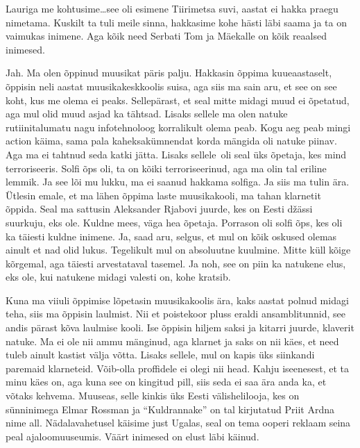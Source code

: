 Lauriga me kohtusime\ldots see oli esimene Tiirimetsa suvi, aastat ei hakka praegu nimetama. Kuskilt ta tuli meile sinna, hakkasime kohe hästi läbi saama ja ta on vaimukas inimene. Aga kõik need Serbati Tom ja Mäekalle  on kõik reaalsed inimesed.


Jah. Ma olen õppinud muusikat päris palju. Hakkasin õppima kuueaastaselt, õppisin neli aastat muusikakeskkoolis suisa, aga siis ma sain aru, et see on see koht, kus me olema ei peaks. Sellepärast, et seal mitte midagi muud ei õpetatud, aga mul olid muud asjad ka tähtsad. Lisaks sellele ma olen natuke rutiinitalumatu nagu infotehnoloog korralikult olema peab. Kogu aeg peab mingi action käima, sama pala kaheksakümnendat korda mängida oli natuke piinav. Aga ma ei  tahtnud seda katki jätta.  Lisaks sellele oli seal üks õpetaja, kes mind terroriseeris. Solfi õps oli, ta on kõiki terroriseerinud, aga ma olin tal eriline lemmik. Ja see lõi mu lukku, ma ei saanud hakkama solfiga. Ja siis ma tulin ära. Ütlesin emale, et ma lähen õppima laste muusikakooli, ma tahan klarnetit õppida. Seal ma sattusin Aleksander Rjabovi juurde, kes on Eesti džässi suurkuju, eks ole. Kuldne mees, väga hea õpetaja. Porrason oli solfi õps, kes oli ka täiesti  kuldne inimene. Ja, saad aru, selgus, et mul on kõik oskused olemas ainult et nad olid lukus. Tegelikult mul on absoluutne kuulmine. Mitte küll  kõige kõrgemal, aga täiesti arvestataval tasemel. Ja noh, see on piin ka natukene elus, eks ole, kui natukene midagi valesti on, kohe kratsib. 

Kuna ma viiuli  õppimise lõpetasin muusikakoolis ära, kaks aastat polnud midagi teha, siis ma õppisin laulmist. Nii et poistekoor pluss eraldi ansamblitunnid, see andis pärast kõva laulmise kooli. Ise õppisin hiljem saksi ja kitarri juurde, klaverit natuke. Ma ei ole nii ammu mänginud, aga klarnet ja saks on nii käes, et need tuleb ainult kastist välja võtta. Lisaks sellele, mul on kapis üks siinkandi paremaid klarneteid. Võib-olla proffidele ei olegi nii head. Kahju iseenesest, et  ta minu käes on, aga kuna see on kingitud pill, siis seda ei saa ära anda ka, et võtaks kehvema. Muuseas, selle kinkis üks Eesti välishelilooja, kes on sünninimega Elmar Rossman ja \enquote{Kuldrannake} on tal kirjutatud Priit Ardna nime all. Nädalavahetusel käisime just Ugalas, seal on tema ooperi reklaam seina peal ajaloomuuseumis. Väärt inimesed on elust läbi käinud. 

